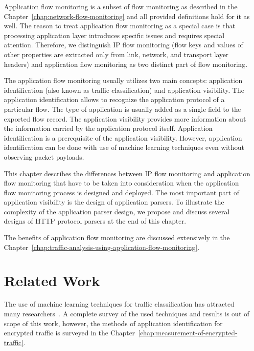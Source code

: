 Application flow monitoring is a subset of flow monitoring as described in the Chapter~\ref{chap:network-flow-monitoring} and all provided definitions hold for it as well. The reason to treat application flow monitoring as a special case is that processing application layer introduces specific issues and requires special attention. Therefore, we distinguish IP flow monitoring (flow keys and values of other properties  are extracted only from link, network, and transport layer headers) and application flow monitoring as two distinct part of flow monitoring.

The application flow monitoring usually utilizes two main concepts: application identification (also known as traffic classification) and application visibility. The application identification allows to recognize the application protocol of a particular flow. The type of application is usually added as a single field to the exported flow record. The application visibility provides more information about the information carried by the application protocol itself. Application identification is a prerequisite of the application visibility. However, application identification can be done with use of machine learning techniques even without observing packet payloads.

This chapter describes the differences between IP flow monitoring and application flow monitoring that have to be taken into consideration when the application flow monitoring process is designed and deployed. The most important part of application visibility is the design of application parsers. To illustrate the complexity of the application parser design, we propose and discuss several designs of HTTP protocol parsers at the end of this chapter.

The benefits of application flow monitoring are discussed extensively in the Chapter~\ref{chap:traffic-analysis-using-application-flow-monitoring}.

\section{Related Work}

The use of machine learning techniques for traffic classification has attracted many researchers~\cite{Nguyen-2008-Survey, Dainotti-2012-Issues, Finsterbusch-2014-Survey}. A complete survey of the used techniques and results is out of scope of this work, however, the methods of application identification for encrypted traffic is surveyed in the Chapter~\ref{chap:measurement-of-encrypted-traffic}.

